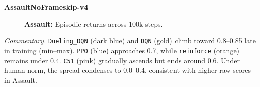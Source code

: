 \noindent
\textbf{AssaultNoFrameskip-v4}
\begin{figure}[htbp]
	\centering
	\quad
	\caption{\textbf{Assault:} Episodic returns across 100k steps.}
	\label{fig:assault_comparison_combined}
\end{figure}

\noindent
\emph{Commentary.}
\texttt{Dueling\_DQN} (dark blue) and \texttt{DQN} (gold) climb toward 0.8--0.85 
late in training (min--max). 
\texttt{PPO} (blue) approaches 0.7, while \texttt{reinforce} (orange) remains 
under 0.4. \texttt{C51} (pink) gradually ascends but ends around 0.6. 
Under human norm, the spread condenses to 0.0--0.4, consistent with higher 
raw scores in Assault.

\bigskip

